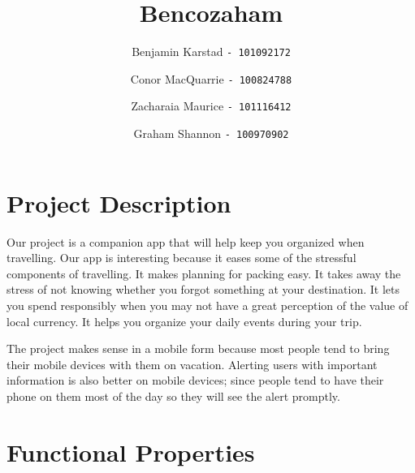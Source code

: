 \documentclass[12pt]{article}
\title{Bencozaham}
\author{
	Benjamin Karstad
	\texttt{- 101092172}
	\and
	Conor MacQuarrie
	\texttt{- 100824788}
	\and
	Zacharaia Maurice
	\texttt{- 101116412}
	\and
	Graham Shannon
	\texttt{- 100970902}
}
\begin{document}
\maketitle

\section*{Project Description}

Our project is a companion app that will help keep you organized when travelling.
Our app is interesting because it eases some of the stressful components of travelling.
It makes planning for packing easy.
It takes away the stress of not knowing whether you forgot something at your destination.
It lets you spend responsibly when you may not have a great perception of the value of local currency.
It helps you organize your daily events during your trip.

The project makes sense in a mobile form because most people tend to bring their mobile devices with them on vacation.
Alerting users with important information is also better on mobile devices;
since people tend to have their phone on them most of the day so they will see the alert promptly.

\section*{Functional Properties}
\end{document}
